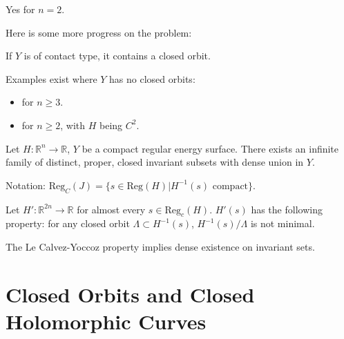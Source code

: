 \begin{theorem}

Yes for $n=2$.

\end{theorem}

Here is some more progress on the problem:

\begin{theorem}

If $Y$ is of contact type, it contains a closed orbit.

\end{theorem}

\begin{theorem}
    Examples exist where $Y$ has no closed orbits:
        \begin{itemize}
            \item {} for $n \geq 3$.
            \item {} for $n \geq 2$, with $H$ being $C^2$.
        \end{itemize}
\end{theorem}

\begin{theorem}

Let $H: \mathbb{R}^{n} \to \mathbb{R}$, $Y$ be a compact regular energy surface. There exists an infinite family of distinct, proper, closed invariant subsets with dense union in $Y$.

\end{theorem}

Notation: $\text{Reg}_C(J)=\{ s\in \text{Reg}(H)| H^{-1}(s)\text{ compact} \}$.

\begin{theorem}
[Theorem B]

Let $H': \mathbb{R}^{2n} \to \mathbb{R}$ for almost every $s\in \text{Reg}_c(H)$. $H'(s)$ has the following property: for any closed orbit $\Lambda \subset H^{-1}(s)$, $H^{-1}(s)/\Lambda$ is not minimal.

\end{theorem}

\begin{remark}

The Le Calvez-Yoccoz property implies dense existence on invariant sets.

\end{remark}

\section{Closed Orbits and Closed Holomorphic Curves}

